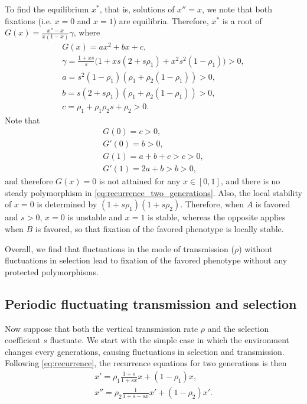 \documentclass[12pt]{extarticle} %
\begin{document}
To find the equilibrium $x^*$, that is, solutions of $x''=x$, we note that both fixations (i.e. $x=0$ and $x=1$) are equilibria. 
Therefore, $x^*$ is a root of $G(x) = \frac{x''-x}{x(1-x)} \gamma$, where
\begin{align}
G(x) = ax^2+bx+c, \\
\gamma = \frac{1+xs}{s} \Big( 1 + xs(2+s\rho_1) + x^2 s^2 (1-\rho_1) \Big) > 0, \\
a = s^2 (1-\rho_1) (\rho_1 + \rho_2(1-\rho_1)) > 0, \\
b = s(2+s\rho_1)(\rho_1 + \rho_2(1-\rho_1)) > 0, \\
c = \rho_1 + \rho_1 \rho_2 s + \rho_2 > 0.
\end{align} 
Note that 
\begin{align}
G(0) = c > 0,\\ 
G'(0) = b > 0,\\
G(1)=a+b+c>c>0,\\
G'(1)=2a+b>b>0,
\end{align}
and therefore $G(x)=0$ is not attained for any $x \in [0,1]$, and there is no steady polymorphism in \eqref{eq:recurrence_two_generations}.
Also, the local stability of $x=0$ is determined by $(1+s\rho_1)(1+s\rho_2)$.
Therefore, when $A$ is favored and $s>0$, $x=0$ is unstable and $x=1$ is stable, whereas the opposite applies when $B$ is favored, so that fixation of the favored phenotype is locally stable.

Overall, we find that fluctuations in the mode of transmission ($\rho$) without fluctuations in selection lead to fixation of the favored phenotype without any protected polymorphisms.

\subsection*{Periodic fluctuating transmission and selection}

Now suppose that both the vertical transmission rate $\rho$ and the selection coefficient $s$ fluctuate.
We start with the simple case in which the environment changes every generations, causing fluctuations in selection and transmission.
Following \eqref{eq:recurrence}, the recurrence equations for two generations is then
\begin{equation}\begin{aligned} \label{eq:recurrence_two_generations_fluc_s}
x' = \rho_1 \frac{1+s}{1+sx} x + (1-\rho_1)x, \\
x'' = \rho_2 \frac{1}{1+s-sx} x' + (1-\rho_2)x'.
\end{aligned}\end{equation}
\end{document}
